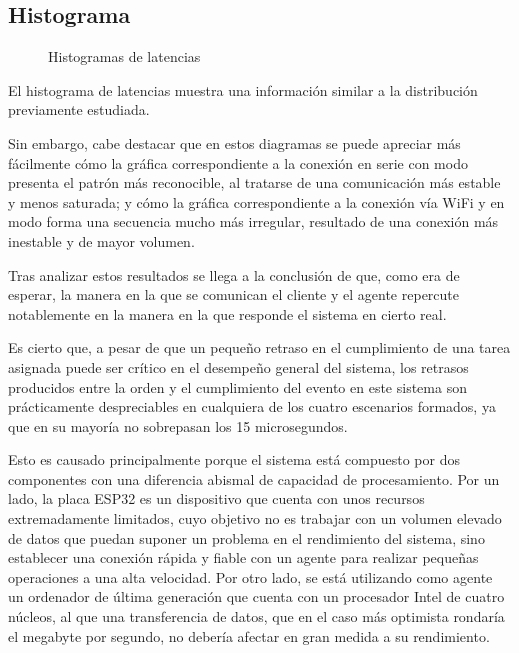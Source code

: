 \documentclass[a4paper,11pt,spanish]{sphinxmanual}
\let\sphinxpxdimen\pdfpxdimen\else\newdimen\sphinxpxdimen
\begin{document}
\subsection{Histograma}
\label{\detokenize{resultados:histograma}}
\begin{figure}[htbp]
\centering
\capstart

\noindent\sphinxincludegraphics[width=650\sphinxpxdimen]{{latency_hist}.png}
\caption{Histogramas de latencias}\label{\detokenize{resultados:id3}}\end{figure}

\sphinxAtStartPar
El histograma de latencias muestra una información similar a la distribución previamente estudiada.

\sphinxAtStartPar
Sin embargo, cabe destacar que en estos diagramas se puede apreciar más fácilmente
cómo la gráfica correspondiente a la conexión en serie con modo  presenta
el patrón más reconocible, al tratarse de una comunicación más estable y menos saturada;
y cómo la gráfica correspondiente a la conexión vía Wi\sphinxhyphen{}Fi y en modo  forma
una secuencia mucho más irregular, resultado de una conexión más inestable y de
mayor volumen.

\sphinxAtStartPar
Tras analizar estos resultados se llega a la conclusión de que, como era de esperar,
la manera en la que se comunican el cliente y el agente repercute notablemente en la
manera en la que responde el sistema en cierto real.

\sphinxAtStartPar
Es cierto que, a pesar de que un pequeño retraso en el cumplimiento de
una tarea asignada puede ser crítico en el desempeño general del sistema, los retrasos
producidos entre la orden y el cumplimiento del evento en este sistema son prácticamente
despreciables en cualquiera de los cuatro escenarios formados, ya que en su mayoría
no sobrepasan los 15 microsegundos.

\sphinxAtStartPar
Esto es causado principalmente porque el sistema está compuesto por dos componentes con
una diferencia abismal de capacidad de procesamiento. Por un lado, la placa ESP32
es un dispositivo que cuenta con unos recursos extremadamente limitados, cuyo objetivo
no es trabajar con un volumen elevado de datos que puedan suponer un problema en el
rendimiento del sistema, sino establecer una conexión rápida y fiable con un agente
para realizar pequeñas operaciones a una alta velocidad. Por otro lado, se está
utilizando como agente un ordenador de última generación que cuenta con un procesador Intel
de cuatro núcleos, al que una transferencia de datos, que en el caso más optimista
rondaría el megabyte por segundo, no debería afectar en gran medida a su rendimiento.
\end{document}
